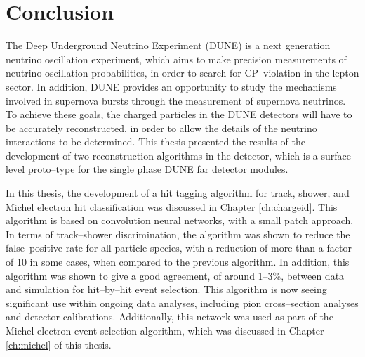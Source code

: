\chapter{\label{ch:conclusion}Conclusion} 


\minitoc

The Deep Underground Neutrino Experiment (DUNE) is a next generation neutrino
oscillation experiment, which aims to make precision measurements of neutrino
oscillation probabilities, in order to search for CP--violation in the lepton
sector. In addition, DUNE provides an opportunity to study the mechanisms
involved in supernova bursts through the measurement of supernova neutrinos. 
To achieve these goals, the charged particles in the DUNE detectors will have to
be accurately reconstructed, in order to allow the details of the neutrino
interactions to be determined. This thesis presented the results of the
development of two reconstruction algorithms in the \protodune{} detector, which
is a surface level proto--type for the single phase DUNE far detector modules. 

In this thesis, the development of a hit tagging algorithm for track, shower, 
and Michel electron hit classification was discussed in Chapter 
\ref{ch:chargeid}. This algorithm is based on convolution neural networks, 
with a small patch approach. In terms of track--shower discrimination, the 
algorithm was shown to reduce the false--positive rate for all particle 
species, with a reduction of more than a factor of 10 in some cases, when
compared to the previous algorithm. In addition, this algorithm was shown to 
give a good agreement, of around 1--3\%, between data and simulation for 
hit--by--hit event selection. This algorithm is now seeing significant use 
within ongoing \protodune{} data analyses, including pion cross--section 
analyses and detector calibrations. Additionally, this network was used as 
part of the Michel electron event selection algorithm, which was discussed in 
Chapter \ref{ch:michel} of this thesis.

